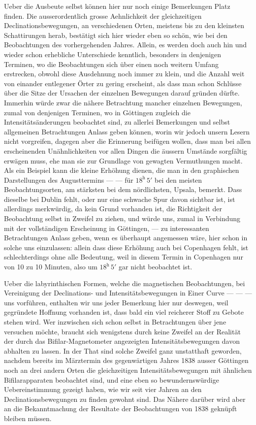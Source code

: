 \documentclass[12pt,a4paper]{article}
\begin{document}
Ueber die Ausbeute selbst k\"onnen hier nur noch einige Bemerkungen Platz finden. Die ausserordentlich grosse Aehnlichkeit der gleichzeitigen Declinationsbewegungen, an verschiedenen Orten, meistens bis zu den kleinsten Schattirungen herab, best\"atigt sich hier wieder eben so sch\"on, wie bei den Beobachtungen des vorhergehenden Jahres. Allein, es werden doch auch hin und wieder schon erhebliche Unterschiede kenntlich, besonders in denjenigen Terminen, wo die Beobachtungen sich \"uber einen noch weitern Umfang erstrecken, obwohl diese Ausdehnung noch immer zu klein, und die Anzahl weit von einander entlegener \"Orter zu gering erscheint, als dass man schon Schl\"usse \"uber die Sitze der Ursachen der einzelnen Bewegungen darauf gr\"unden d\"urfte. Immerhin w\"urde zwar die n\"ahere Betrachtung mancher einzelnen Bewegungen, zumal von denjenigen Terminen, wo in G\"ottingen zugleich die Intensit\"ats\"anderungen beobachtet sind, zu allerlei Bemerkungen und selbst allgemeinen Betrachtungen Anlass geben k\"onnen, worin wir jedoch unsern Lesern nicht vorgreifen, dagegen aber die Erinnerung beif\"ugen wollen, dass man bei allen erscheinenden Un\"ahnlichkeiten vor allen Dingen die \"aussern Umst\"ande sorgf\"altig erw\"agen muss, ehe man sie zur Grundlage von gewagten Vermuthungen macht. Als ein Beispiel kann die kleine Erh\"ohung dienen, die man in den graphischen Darstellungen des Augusttermins --- --- f\"ur $18^{\text{h}}\,5'$ bei den meisten Beobachtungsorten, am st\"arksten bei dem n\"ordlichsten, Upsala, bemerkt. Dass dieselbe bei Dublin fehlt, oder nur eine schwache Spur davon sichtbar ist, ist allerdings merkw\"urdig, da kein Grund vorhanden ist, die Richtigkeit der Beobachtung selbst in Zweifel zu ziehen, und w\"urde uns, zumal in Verbindung mit der vollst\"andigen Erscheinung in G\"ottingen, --- zu interessanten Betrachtungen Anlass geben, wenn es \"uberhaupt angemessen w\"are, hier schon in solche uns einzulassen: allein dass diese Erh\"ohung auch bei Copenhagen fehlt, ist schlechterdings ohne alle Bedeutung, weil in diesem Termin in Copenhagen nur von 10 zu 10 Minuten, also um $18^{\text{h}}\,5'$ gar nicht beobachtet ist.

Ueber die labyrinthischen Formen, welche die magnetischen Beobachtungen, bei Vereinigung der Declinations- und Intensit\"atsbewegungen in Einer Curve --- --- --- uns vorf\"uhren, enthalten wir uns jeder Bemerkung hier nur deswegen, weil gegr\"undete Hoffnung vorhanden ist, dass bald ein viel reicherer Stoff zu Gebote stehen wird. Wer inzwischen sich schon selbst in Betrachtungen \"uber jene versuchen m\"ochte, braucht sich wenigstens durch keine Zweifel an der Realit\"at der durch das Bifilar-Magnetometer angezeigten Intensit\"atsbewegungen davon abhalten zu lassen. In der That sind solche Zweifel ganz unstatthaft geworden, nachdem bereits im M\"arztermin des gegenw\"artigen Jahres 1838 ausser G\"ottingen noch an drei andern Orten die gleichzeitigen Intensit\"atsbewegungen mit \"ahnlichen Bifilarapparaten beobachtet sind, und eine eben so bewundernsw\"urdige Uebereinstimmung gezeigt haben, wie wir seit vier Jahren an den Declinationsbewegungen zu finden gewohnt sind. Das N\"ahere dar\"uber wird aber an die Bekanntmachung der Resultate der Beobachtungen von 1838 gekn\"upft bleiben m\"ussen.
\end{document}
